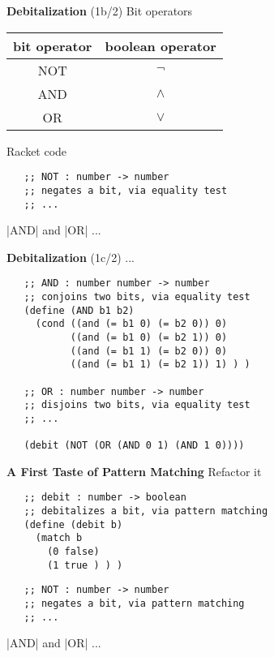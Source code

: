 \documentclass[14pt]{beamer}
\begin{document}
\begin{frame}[fragile]{{\bf Debitalization} (1b/2)}
 Bit operators
 \begin{table}
  \centering
  \begin{tabular}{|c|c|}
   \hline
   bit operator & boolean operator \\
   \hline
   NOT & $\neg$ \\
   \hline
   AND & $\wedge$ \\
   \hline
   OR  & $\vee$  \\
   \hline
  \end{tabular}
 \end{table}

 \pause
 
 Racket code
 {\footnotesize
  \begin{verbatim}
   ;; NOT : number -> number
   ;; negates a bit, via equality test
   ;; ...
  \end{verbatim}
 }

 \pause

 |AND| and |OR| ...
\end{frame}

\begin{frame}[fragile]{{\bf Debitalization} (1c/2)}
 ...

 \pause

 {\footnotesize
  \begin{verbatim}
   ;; AND : number number -> number
   ;; conjoins two bits, via equality test
   (define (AND b1 b2)
     (cond ((and (= b1 0) (= b2 0)) 0)
           ((and (= b1 0) (= b2 1)) 0)
           ((and (= b1 1) (= b2 0)) 0)
           ((and (= b1 1) (= b2 1)) 1) ) )

   ;; OR : number number -> number
   ;; disjoins two bits, via equality test
   ;; ...

   (debit (NOT (OR (AND 0 1) (AND 1 0))))
  \end{verbatim}
 }
\end{frame}

\begin{frame}[fragile]{\bf A First Taste of Pattern Matching}
 Refactor it
 {\footnotesize
  \begin{verbatim}
   ;; debit : number -> boolean
   ;; debitalizes a bit, via pattern matching
   (define (debit b)
     (match b
       (0 false)
       (1 true ) ) )
  \end{verbatim}
 }

 \pause

 {\footnotesize
  \begin{verbatim}
   ;; NOT : number -> number
   ;; negates a bit, via pattern matching
   ;; ...
  \end{verbatim}
 }

 \pause

 |AND| and |OR| ...
\end{frame}
\end{document}

